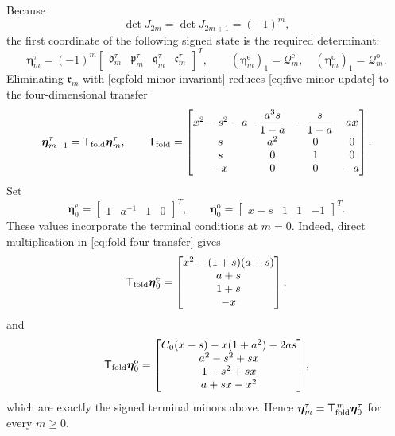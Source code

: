 \documentclass[12pt,anonymous]{iopjournal}
\numberwithin{equation}{section}
\theoremstyle{remark}
\begin{document}
Because
\[
 \det J_{2m}=\det J_{2m+1}=(-1)^m,
\]
the first coordinate of the following signed state is the required
determinant:
\[
 \boldsymbol\eta_m^\tau
 =
 (-1)^m
 \begin{bmatrix}
 \mathfrak d_m^\tau&\mathfrak p_m^\tau&
 \mathfrak q_m^\tau&\mathfrak c_m^\tau
 \end{bmatrix}^{T},
 \qquad
 (\boldsymbol\eta_m^{\mathrm e})_1=\mathcal Q_m^{\mathrm e},
 \quad
 (\boldsymbol\eta_m^{\mathrm o})_1=\mathcal Q_m^{\mathrm o}.
\]
Eliminating \(\mathfrak r_m\) with \eqref{eq:fold-minor-invariant} reduces
\eqref{eq:five-minor-update} to the four-dimensional transfer
\begin{equation}\label{eq:fold-four-transfer}
 \boldsymbol\eta_{m+1}^\tau
 =\mathsf T_{\rm fold}\boldsymbol\eta_m^\tau,
 \qquad
 \mathsf T_{\rm fold}=
 \begin{bmatrix}
 x^2-s^2-a&\dfrac{a^3s}{1-a}&-\dfrac{s}{1-a}&ax\\[2mm]
 s&a^2&0&0\\
 s&0&1&0\\
 -x&0&0&-a
 \end{bmatrix}.
\end{equation}
Set
\begin{equation}\label{eq:fold-transfer-initial}
 \boldsymbol\eta_0^{\mathrm e}
 =\begin{bmatrix}1&a^{-1}&1&0\end{bmatrix}^{T},
 \qquad
 \boldsymbol\eta_0^{\mathrm o}
 =\begin{bmatrix}x-s&1&1&-1\end{bmatrix}^{T}.
\end{equation}
These values incorporate the terminal conditions at \(m=0\).
Indeed, direct multiplication in \eqref{eq:fold-four-transfer} gives
\[
 \mathsf T_{\rm fold}\boldsymbol\eta_0^{\mathrm e}
 =
 \begin{bmatrix}
 x^2-(1+s)(a+s)\\ a+s\\1+s\\-x
 \end{bmatrix},
\]
and
\[
 \mathsf T_{\rm fold}\boldsymbol\eta_0^{\mathrm o}
 =
 \begin{bmatrix}
 C_0(x-s)-x(1+a^2)-2as\\
 a^2-s^2+sx\\
 1-s^2+sx\\
 a+sx-x^2
 \end{bmatrix},
\]
which are exactly the signed terminal minors above.  Hence
\(\boldsymbol\eta_m^\tau
=\mathsf T_{\rm fold}^{\,m}\boldsymbol\eta_0^\tau\) for every
\(m\geq0\).
\end{document}
